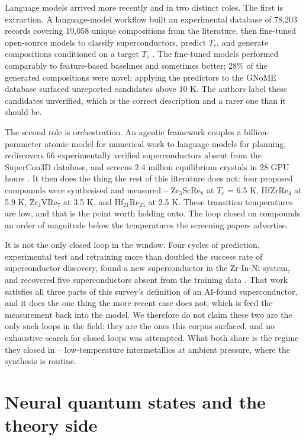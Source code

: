 \documentclass[
  11pt,
]{article}
\begin{document}
Language models arrived more recently and in two distinct roles. The
first is extraction. A language-model workflow built an experimental
database of 78,203 records covering 19,058 unique compositions from the
literature, then fine-tuned open-source models to classify
superconductors, predict \(T_c\), and generate compositions conditioned
on a target \(T_c\) \citep{itani2025large}. The fine-tuned models
performed comparably to feature-based baselines and sometimes better;
28\% of the generated compositions were novel; applying the predictors
to the GNoME database \citep{merchant2023scaling} surfaced unreported
candidates above 10 K. The authors label these candidates unverified,
which is the correct description and a rarer one than it should be.

The second role is orchestration. An agentic framework couples a
billion-parameter atomic model for numerical work to language models for
planning, rediscovers 66 experimentally verified superconductors absent
from the SuperCon3D database, and screens 2.4 million equilibrium
crystals in 28 GPU hours \citep{li2026agentic}. It then does the thing
the rest of this literature does not: four proposed compounds were
synthesised and measured -- Zr\(_3\)ScRe\(_8\) at \(T_c\) = 6.5 K,
HfZrRe\(_4\) at 5.9 K, Zr\(_4\)VRe\(_7\) at 3.5 K, and
Hf\(_{21}\)Re\(_{25}\) at 2.5 K. These transition temperatures are low,
and that is the point worth holding onto. The loop closed on compounds
an order of magnitude below the temperatures the screening papers
advertise.

It is not the only closed loop in the window. Four cycles of prediction,
experimental test and retraining more than doubled the success rate of
superconductor discovery, found a new superconductor in the Zr-In-Ni
system, and recovered five superconductors absent from the training data
\citep{pogue2022closed}. That work satisfies all three parts of this
survey's definition of an AI-found superconductor, and it does the one
thing the more recent case does not, which is feed the measurement back
into the model. We therefore do not claim these two are the only such
loops in the field: they are the ones this corpus surfaced, and no
exhaustive search for closed loops was attempted. What both share is the
regime they closed in -- low-temperature intermetallics at ambient
pressure, where the synthesis is routine.

\section{Neural quantum states and the theory
side}\label{neural-quantum-states-and-the-theory-side}
\end{document}
